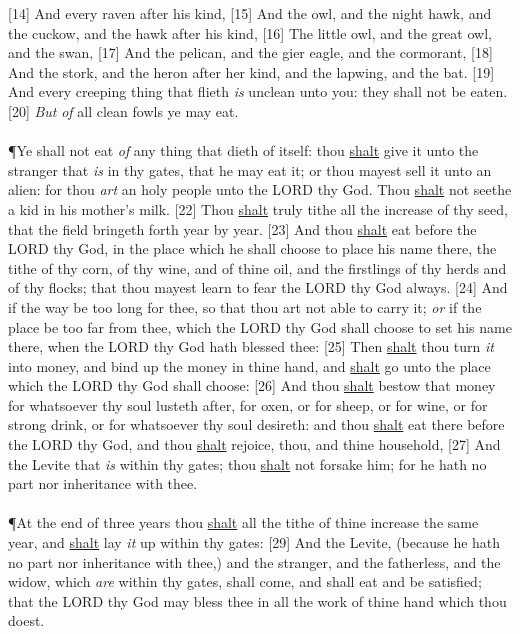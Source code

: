 [14] \textcolor[cmyk]{0.99998,1,0,0}{And every raven after his kind,}
[15] \textcolor[cmyk]{0.99998,1,0,0}{And the owl, and the night hawk, and the cuckow, and the hawk after his kind,}
[16] \textcolor[cmyk]{0.99998,1,0,0}{The little owl, and the great owl, and the swan,}
[17] \textcolor[cmyk]{0.99998,1,0,0}{And the pelican, and the gier eagle, and the cormorant,}
[18] \textcolor[cmyk]{0.99998,1,0,0}{And the stork, and the heron after her kind, and the lapwing, and the bat.}
[19] \textcolor[cmyk]{0.99998,1,0,0}{And every creeping thing that flieth \emph{is} unclean unto you: they shall not be eaten.}
[20] \textcolor[cmyk]{0.99998,1,0,0}{\emph{But} \emph{of} all clean fowls ye may eat.}\\
\\
\P \textcolor[cmyk]{0.99998,1,0,0}{Ye shall not eat \emph{of} any thing that dieth of itself: thou \underline{shalt} give it unto the stranger that \emph{is} in thy gates, that he may eat it; or thou mayest sell it unto an alien: for thou \emph{art} an holy people unto the LORD thy God. Thou \underline{shalt} not seethe a kid in his mother's milk.}
[22] \textcolor[cmyk]{0.99998,1,0,0}{Thou \underline{shalt} truly tithe all the increase of thy seed, that the field bringeth forth year by year.}
[23] \textcolor[cmyk]{0.99998,1,0,0}{And thou \underline{shalt} eat before the LORD thy God, in the place which he shall choose to place his name there, the tithe of thy corn, of thy wine, and of thine oil, and the firstlings of thy herds and of thy flocks; that thou mayest learn to fear the LORD thy God always.}
[24] \textcolor[cmyk]{0.99998,1,0,0}{And if the way be too long for thee, so that thou art not able to carry it; \emph{or} if the place be too far from thee, which the LORD thy God shall choose to set his name there, when the LORD thy God hath blessed thee:}
[25] \textcolor[cmyk]{0.99998,1,0,0}{Then \underline{shalt} thou turn \emph{it} into money, and bind up the money in thine hand, and \underline{shalt} go unto the place which the LORD thy God shall choose:}
[26] \textcolor[cmyk]{0.99998,1,0,0}{And thou \underline{shalt} bestow that money for whatsoever thy soul lusteth after, for oxen, or for sheep, or for wine, or for strong drink, or for whatsoever thy soul desireth: and thou \underline{shalt} eat there before the LORD thy God, and thou \underline{shalt} rejoice, thou, and thine household,}
[27] \textcolor[cmyk]{0.99998,1,0,0}{And the Levite that \emph{is} within thy gates; thou \underline{shalt} not forsake him; for he hath no part nor inheritance with thee.}\\
\\
\P \textcolor[cmyk]{0.99998,1,0,0}{At the end of three years thou \underline{shalt}  all the tithe of thine increase the same year, and \underline{shalt} lay \emph{it} up within thy gates:}
[29] \textcolor[cmyk]{0.99998,1,0,0}{And the Levite, (because he hath no part nor inheritance with thee,) and the stranger, and the fatherless, and the widow, which \emph{are} within thy gates, shall come, and shall eat and be satisfied; that the LORD thy God may bless thee in all the work of thine hand which thou doest.}
